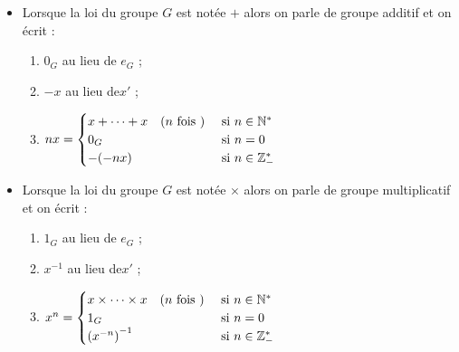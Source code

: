 \begin{nota}
    \begin{itemize}
        \item Lorsque la loi du groupe \(G\) est notée \(+\) alors on parle de groupe additif et on écrit :
        \begin{enumerate}
            \item \(0_G\) au lieu de \(e_G\) ;
            \item \(-x\) au lieu de\( x'\) ;
            \item \(
                nx = \begin{cases}
                    x+ \dots + x \quad(n \text{ fois }) &\text{ si } n \in \mathbb{N}^* \\
                    0_G &\text{ si } n = 0\\
                    -(-nx) &\text{ si } n \in \mathbb{Z}_-^*
                \end{cases}\)
        \end{enumerate}
        \item Lorsque la loi du groupe \(G\) est notée \(\times\) alors on parle de groupe multiplicatif et on écrit : 
        \begin{enumerate}
            \item \(1_G\) au lieu de \(e_G\) ;
            \item \(x^{-1}\) au lieu de\( x'\) ;
            \item \(
                x^n = \begin{cases}
                    x\times \dots \times x \quad(n \text{ fois }) &\text{ si } n \in \mathbb{N}^* \\
                    1_G &\text{ si } n = 0\\
                    \left(x^{-n}\right)^{-1} &\text{ si } n \in \mathbb{Z}_-^*
                \end{cases}\)
        \end{enumerate}
    \end{itemize}
\end{nota}

